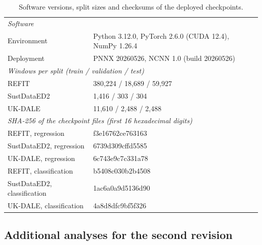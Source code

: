 \begin{table}[H]
\centering
\caption{Software versions, split sizes and checksums of the deployed checkpoints.}
\label{tab:repro}
\footnotesize
\begin{tabular}{@{}p{2.3cm}p{5.7cm}@{}}
\toprule
\multicolumn{2}{l}{\textit{Software}} \\
Environment & Python 3.12.0, PyTorch 2.6.0 (CUDA 12.4), NumPy 1.26.4 \\
Deployment & PNNX 20260526, NCNN 1.0 (build 20260526) \\
\midrule
\multicolumn{2}{l}{\textit{Windows per split (train / validation / test)}} \\
REFIT & 380{,}224 / 18{,}689 / 59{,}927 \\
SustDataED2 & 1{,}416 / 303 / 304 \\
UK-DALE & 11{,}610 / 2{,}488 / 2{,}488 \\
\midrule
\multicolumn{2}{l}{\textit{SHA-256 of the checkpoint files (first 16 hexadecimal digits)}} \\
REFIT, regression & f3e16762ce763163 \\
SustDataED2, regression & 6739d309cffd5585 \\
UK-DALE, regression & 6c743e9c7c331a78 \\
REFIT, classification & b5408c030b2b4508 \\
SustDataED2, classification & 1ac6a0a9d5136d90 \\
UK-DALE, classification & 4a8d8dfc9bf5f326 \\
\bottomrule
\end{tabular}
\end{table}

\subsection*{Additional analyses for the second revision}

